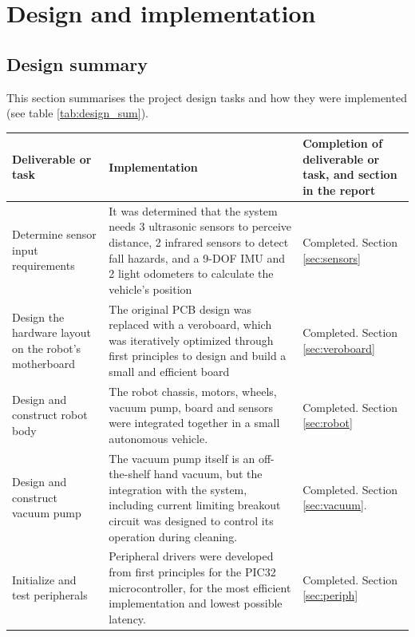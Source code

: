 
\section{Design and implementation}

\subsection{Design summary}

This section summarises the project design tasks and how they were implemented (see table \ref{tab:design_sum}).

\begin{longtable}[H]{|p{}|p{}|p{}|} \hline
    \textbf{Deliverable or task} & \textbf{Implementation} & \textbf{Completion of deliverable or task, and section in the report} \\ \hline
    Determine sensor input requirements & 
    It was determined that the system needs 3 ultrasonic sensors to perceive distance, 2 infrared sensors to detect fall hazards, and a 9-DOF IMU and 2 light odometers to calculate the vehicle's position &
    Completed. Section \ref{sec:sensors} \\ \hline
    Design the hardware layout on the robot's motherboard &
    The original PCB design was replaced with a veroboard, which was iteratively optimized through first principles to design and build a small and efficient board & 
    Completed. Section \ref{sec:veroboard} \\ \hline
    Design and construct robot body &
    The robot chassis, motors, wheels, vacuum pump, board and sensors were integrated together in a small autonomous vehicle. & 
    Completed. Section \ref{sec:robot} \\ \hline
    Design and construct vacuum pump &
    The vacuum pump itself is an off-the-shelf hand vacuum, but the integration with the system, including current limiting breakout circuit was designed to control its operation during cleaning. &
    Completed. Section \ref{sec:vacuum}. \\ \hline
    Initialize and test peripherals &
    Peripheral drivers were developed from first principles for the PIC32 microcontroller, for the most efficient implementation and lowest possible latency. &
    Completed. Section \ref{sec:periph} \\ \hline

\end{longtable}
